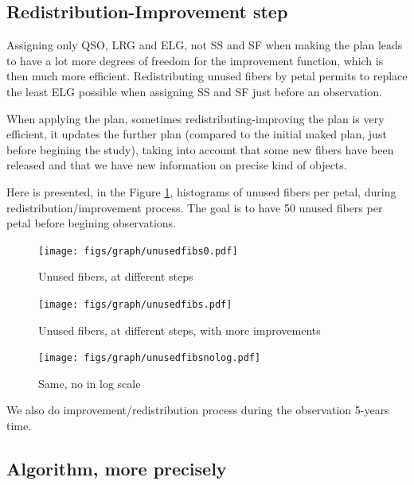 \documentclass{article}
\begin{document}
\subsection{Redistribution-Improvement step}
Assigning only QSO, LRG and ELG, not SS and SF when making the plan leads to have a lot more degrees of freedom for the improvement function, which is then much more efficient. Redistributing unused fibers by petal permits to replace the least ELG possible when assigning SS and SF just before an observation.

When applying the plan, sometimes redistributing-improving the plan is very efficient, it updates the further plan (compared to the initial maked plan, just before begining the study), taking into account that some new fibers have been released and that we have new information on precise kind of objects.

Here is presented, in the Figure \ref{unusedfibs0}, histograms of unused fibers per petal, during redistribution/improvement process. The goal is to have 50 unused fibers per petal before begining observations.

\begin{figure}[H]\begin{center}
	\texttt{[image: figs/graph/unusedfibs0.pdf]}
	\caption{Unused fibers, at different steps}\label{unusedfibs0}
\end{center}\end{figure}

\begin{figure}[H]\begin{center}
	\texttt{[image: figs/graph/unusedfibs.pdf]}
	\caption{Unused fibers, at different steps, with more improvements}\label{unusedfibs}
\end{center}\end{figure}

\begin{figure}[H]\begin{center}
	\texttt{[image: figs/graph/unusedfibsnolog.pdf]}
	\caption{Same, no in log scale}\label{unusedfibsnolog}
\end{center}\end{figure}


We also do improvement/redistribution process during the observation 5-years time.

\subsection{Algorithm, more precisely}
\end{document}
